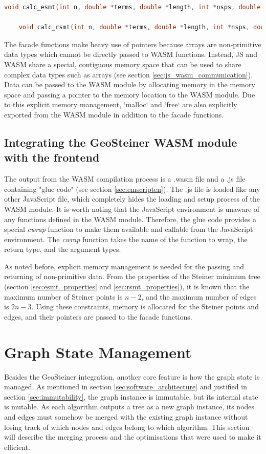 \documentclass{l4proj}
\begin{document}
\begin{lstlisting}[language=C,caption=Wrapper functions for the GeoSteiner library,label=lst:wrapper_functions]
    void calc_esmt(int n, double *terms, double *length, int *nsps, double *sps, int *nedges, int *edges);

    void calc_rsmt(int n, double *terms, double *length, int *nsps, double *sps, int *nedges, int *edges);
\end{lstlisting}

The facade functions make heavy use of pointers because arrays are non-primitive data types which cannot be directly passed to WASM functions. Instead, JS and WASM share a special, contiguous memory space that can be used to share complex data types such as arrays (see section \ref{sec:js_wasm_communication}). Data can be passed to the WASM module by allocating memory in the memory space and passing a pointer to the memory location to the WASM module. Due to this explicit memory management, `malloc` and `free` are also explicitly exported from the WASM module in addition to the facade functions.

\subsection{Integrating the GeoSteiner WASM module with the frontend}
The output from the WASM compilation process is a .wasm file and a .js file containing "glue code" (see section \ref{sec:emscripten}). The .js file is loaded like any other JavaScript file, which completely hides the loading and setup process of the WASM module.
It is worth noting that the JavaScript environment is unaware of any functions defined in the WASM module. Therefore, the glue code provides a special \textit{cwrap} function to make them available and callable from the JavaScript environment. The \textit{cwrap} function takes the name of the function to wrap, the return type, and the argument types.

As noted before, explicit memory management is needed for the passing and returning of non-primitive data. From the properties of the Steiner minimum tree (section \ref{sec:esmt_properties} and \ref{sec:rsmt_properties}), it is known that the maximum number of Steiner points is $n - 2$, and the maximum number of edges is $2n - 3$. Using these constraints, memory is allocated for the Steiner points and edges, and their pointers are passed to the facade functions.

\section{Graph State Management}
\label{sec:graph_state_management}
Besides the GeoSteiner integration, another core feature is how the graph state is managed. As mentioned in section \ref{sec:software_architecture} and justified in section \ref{sec:immutability}, the graph instance is immutable, but its internal state is mutable.
As each algorithm outputs a tree as a new graph instance, its nodes and edges must somehow be merged with the existing graph instance without losing track of which nodes and edges belong to which algorithm. This section will describe the merging process and the optimisations that were used to make it efficient.
\end{document}
